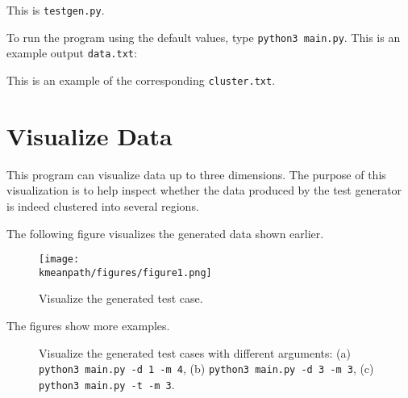 \resetlinenumber[1]
\linenumbers
\begin{tt}
  
\end{tt}
\nolinenumbers

This is {\tt testgen.py}.

\resetlinenumber[1]
\linenumbers
\begin{tt}
  
\end{tt}
\nolinenumbers


To run the program using the default values, type {\tt python3
  main.py}.  This is an example output {\tt data.txt}:

\begin{tt}
  
\end{tt}

This is an example of the corresponding {\tt cluster.txt}.

\begin{tt}
  
\end{tt}

\section{Visualize Data}


This program can visualize data up to three dimensions.  The purpose
of this visualization is to help inspect whether the data produced by
the test generator is indeed clustered into several regions.

\resetlinenumber[1]
\linenumbers
\begin{tt}
  
\end{tt}
\nolinenumbers

The following figure visualizes the generated data
shown earlier.

\begin{figure}[h] \centering
{\texttt{[image: \\kmeanpath/figures/figure1.png]}}
\caption{Visualize the generated test case. }
\end{figure}


The figures show more examples.

\begin{figure}[h] \centering
\caption{Visualize the generated test cases with different arguments:
  (a) {\tt python3 main.py -d 1 -m 4}, (b) {\tt python3 main.py -d 3 -m
    3}, (c) {\tt python3 main.py -t -m 3}. }
\end{figure}

